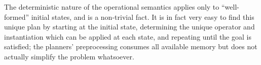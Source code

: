 The deterministic nature of the operational semantics applies only to
``well-formed'' initial states, and is a non-trivial fact. It is in fact very
easy to find this unique plan by starting at the initial state, determining the
unique operator and instantiation which can be applied at each state, and
repeating until the goal is satisfied; the planners' preprocessing consumes all
available memory but does not actually simplify the problem whatsoever. 


